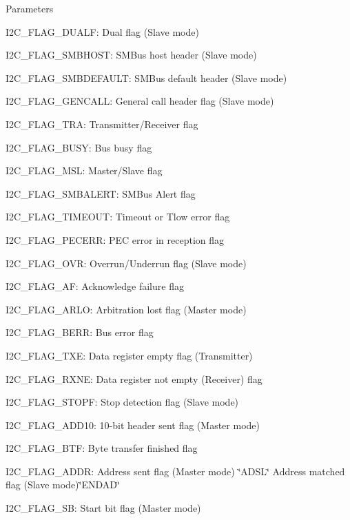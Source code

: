 \begin{DoxyParams}{Parameters}
\begin{DoxyItemize}
\item I2\+C\+\_\+\+F\+L\+A\+G\+\_\+\+D\+U\+A\+LF\+: Dual flag (Slave mode) \item I2\+C\+\_\+\+F\+L\+A\+G\+\_\+\+S\+M\+B\+H\+O\+ST\+: S\+M\+Bus host header (Slave mode) \item I2\+C\+\_\+\+F\+L\+A\+G\+\_\+\+S\+M\+B\+D\+E\+F\+A\+U\+LT\+: S\+M\+Bus default header (Slave mode) \item I2\+C\+\_\+\+F\+L\+A\+G\+\_\+\+G\+E\+N\+C\+A\+LL\+: General call header flag (Slave mode) \item I2\+C\+\_\+\+F\+L\+A\+G\+\_\+\+T\+RA\+: Transmitter/\+Receiver flag \item I2\+C\+\_\+\+F\+L\+A\+G\+\_\+\+B\+U\+SY\+: Bus busy flag \item I2\+C\+\_\+\+F\+L\+A\+G\+\_\+\+M\+SL\+: Master/\+Slave flag \item I2\+C\+\_\+\+F\+L\+A\+G\+\_\+\+S\+M\+B\+A\+L\+E\+RT\+: S\+M\+Bus Alert flag \item I2\+C\+\_\+\+F\+L\+A\+G\+\_\+\+T\+I\+M\+E\+O\+UT\+: Timeout or Tlow error flag \item I2\+C\+\_\+\+F\+L\+A\+G\+\_\+\+P\+E\+C\+E\+RR\+: P\+EC error in reception flag \item I2\+C\+\_\+\+F\+L\+A\+G\+\_\+\+O\+VR\+: Overrun/\+Underrun flag (Slave mode) \item I2\+C\+\_\+\+F\+L\+A\+G\+\_\+\+AF\+: Acknowledge failure flag \item I2\+C\+\_\+\+F\+L\+A\+G\+\_\+\+A\+R\+LO\+: Arbitration lost flag (Master mode) \item I2\+C\+\_\+\+F\+L\+A\+G\+\_\+\+B\+E\+RR\+: Bus error flag \item I2\+C\+\_\+\+F\+L\+A\+G\+\_\+\+T\+XE\+: Data register empty flag (Transmitter) \item I2\+C\+\_\+\+F\+L\+A\+G\+\_\+\+R\+X\+NE\+: Data register not empty (Receiver) flag \item I2\+C\+\_\+\+F\+L\+A\+G\+\_\+\+S\+T\+O\+PF\+: Stop detection flag (Slave mode) \item I2\+C\+\_\+\+F\+L\+A\+G\+\_\+\+A\+D\+D10\+: 10-\/bit header sent flag (Master mode) \item I2\+C\+\_\+\+F\+L\+A\+G\+\_\+\+B\+TF\+: Byte transfer finished flag \item I2\+C\+\_\+\+F\+L\+A\+G\+\_\+\+A\+D\+DR\+: Address sent flag (Master mode) \char`\"{}\+A\+D\+S\+L\char`\"{} Address matched flag (Slave mode)\char`\"{}\+E\+N\+D\+A\+D\char`\"{} \item I2\+C\+\_\+\+F\+L\+A\+G\+\_\+\+SB\+: Start bit flag (Master mode) \end{DoxyItemize}
\\
\hline
\end{DoxyParams}

